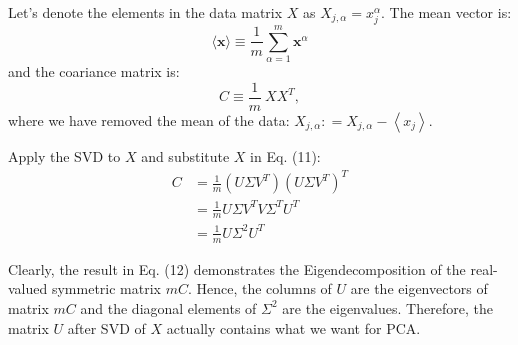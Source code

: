 \begin{questions}
\begin{parts}
\begin{solution}
    Let's denote the elements in the data matrix $X$ as $X _ { j , \alpha } = x _ { j } ^ { \alpha }$. The mean vector is:
    \begin{equation}
        \langle \mathbf { x } \rangle \equiv \frac { 1 } { m } \sum _ { \alpha = 1 } ^ { m } \mathbf { x } ^ { \alpha }
    \end{equation}
    and the coariance matrix is:
    \begin{equation}
            C \equiv \frac { 1 } { m } \  X X  ^ { T },
    \end{equation}
    where we have removed the mean of the data: $X _ { j , \alpha } : = X _ { j , \alpha } - \left\langle x _ { j } \right\rangle$.
    
    Apply the SVD to $X$ and substitute $X$ in Eq. (11):
    \begin{equation}
        \begin{split}
            C &= \frac{1}{m} (U \Sigma V ^{T}) (U \Sigma V ^{T}) ^ {T}\\
            &= \frac{1}{m} U \Sigma V ^ {T} V \Sigma ^ {T} U ^ {T}\\
            &= \frac{1}{m} U \Sigma ^ {2} U ^ {T}
        \end{split}
    \end{equation}
    
    Clearly, the result in Eq. (12) demonstrates the Eigendecomposition of the real-valued symmetric matrix $mC$. Hence, the columns of $U$ are the eigenvectors of matrix $mC$ and the diagonal elements of $\Sigma ^ {2}$ are the eigenvalues. Therefore, the matrix $U$ after SVD of $X$ actually contains what we want for PCA. 
    

\end{solution}
\end{parts}
\end{questions}
